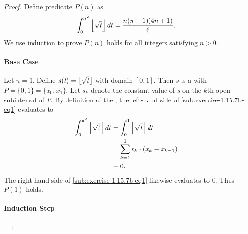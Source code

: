 \documentclass{report}
\begin{document}
\begin{proof}

  Define predicate $P(n)$ as
    \begin{equation}
      \label{sub:exercise-1.15.7b-eq1}
      \int_0^{n^2} \left\lfloor\sqrt{t}\right\rfloor \mathop{dt} = \frac{n(n - 1)(4n + 1)}{6}.
    \end{equation}
  We use induction to prove $P(n)$ holds for all integers satisfying $n > 0$.

  \paragraph{Base Case}%

    Let $n = 1$.
    Define $s(t) = \left\lfloor\sqrt{t}\right\rfloor$ with domain $[0, 1]$.
    Then $s$ is a  with
       $P = \{0, 1\} = \{x_0, x_1\}$.
    Let $s_k$ denote the constant value of $s$ on the $k$th open subinterval of
      $P$.
    By definition of the , the left-hand
      side of \eqref{sub:exercise-1.15.7b-eq1} evaluates to
      \begin{align*}
        \int_0^{n^2} \left\lfloor\sqrt{t}\right\rfloor \mathop{dt}
          & = \int_0^1 \left\lfloor\sqrt{t}\right\rfloor \mathop{dt} \\
          & = \sum_{k=1}^1 s_k \cdot (x_k - x_{k-1}) \\
          & = 0.
      \end{align*}
    The right-hand side of \eqref{sub:exercise-1.15.7b-eq1} likewise evaluates
      to $0$.
    Thus $P(1)$ holds.

  \paragraph{Induction Step}%


\end{proof}
\end{document}
